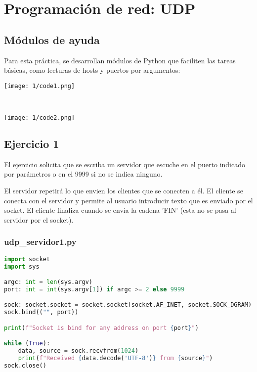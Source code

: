 \section{Programación de red: UDP}
\subsection{Módulos de ayuda}
Para esta práctica, se desarrollan módulos de Python que faciliten las tareas básicas,
como lecturas de hosts y puertos por argumentos: \\
\begin{minipage}{\linewidth}
	\centering
	\texttt{[image: 1/code1.png]}
	\label{fig:1/code1}
\end{minipage}
\\
\begin{minipage}{\linewidth}
	\centering
	\texttt{[image: 1/code2.png]}
	\label{fig:1/code2}
\end{minipage}

\subsection{Ejercicio 1}

El ejercicio solicita que se escriba un servidor que escuche en el puerto indicado por parámetros
o en el 9999 si no se indica ninguno.

El servidor repetirá lo que envien los clientes que se conecten a él.
El cliente se conecta con el servidor y permite al usuario introducir texto que es enviado por el socket.
El cliente finaliza cuando se envía la cadena 'FIN' (esta no se pasa al servidor por el socket).

\subsubsection{udp\_servidor1.py}

\begin{lstlisting}[language=Python]
import socket
import sys

argc: int = len(sys.argv)
port: int = int(sys.argv[1]) if argc >= 2 else 9999

sock: socket.socket = socket.socket(socket.AF_INET, socket.SOCK_DGRAM)
sock.bind(("", port))

print(f"Socket is bind for any address on port {port}")

while (True):
    data, source = sock.recvfrom(1024)
    print(f"Received {data.decode('UTF-8')} from {source}")
sock.close()
\end{lstlisting}


